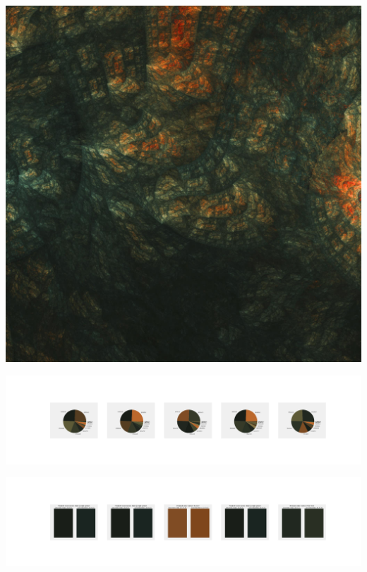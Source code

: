 \documentclass[11pt]{article}
\begin{document}
\begin{landscape}
    \begin{center}
    \includegraphics[width=\textwidth]{./nbimg/file (197).jpg}
    \end{center}

    \begin{center}
    \includegraphics[width=250mm]{./nbimg/pie-108.jpg}
    \end{center}

    \begin{center}
    \includegraphics[width=250mm]{./nbimg/peak-108.jpg}
    \end{center}
    


\end{landscape}
\end{document}
